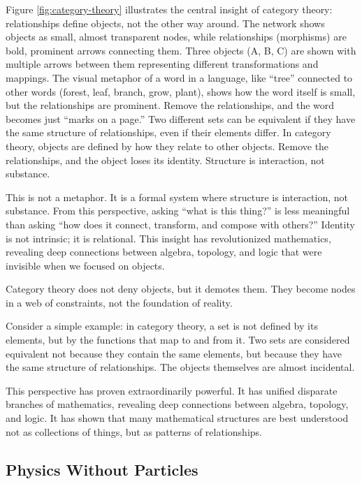 \documentclass[
  openright]{book}
\begin{document}
Figure \ref{fig:category-theory} illustrates the central insight of
category theory: relationships define objects, not the other way around.
The network shows objects as small, almost transparent nodes, while
relationships (morphisms) are bold, prominent arrows connecting them.
Three objects (A, B, C) are shown with multiple arrows between them
representing different transformations and mappings. The visual metaphor
of a word in a language, like ``tree'' connected to other words (forest,
leaf, branch, grow, plant), shows how the word itself is small, but the
relationships are prominent. Remove the relationships, and the word
becomes just ``marks on a page.'' Two different sets can be equivalent
if they have the same structure of relationships, even if their elements
differ. In category theory, objects are defined by how they relate to
other objects. Remove the relationships, and the object loses its
identity. Structure is interaction, not substance.

This is not a metaphor. It is a formal system where structure is
interaction, not substance. From this perspective, asking ``what is this
thing?'' is less meaningful than asking ``how does it connect,
transform, and compose with others?'' Identity is not intrinsic; it is
relational. This insight has revolutionized mathematics, revealing deep
connections between algebra, topology, and logic that were invisible
when we focused on objects.

Category theory does not deny objects, but it demotes them. They become
nodes in a web of constraints, not the foundation of reality.

Consider a simple example: in category theory, a set is not defined by
its elements, but by the functions that map to and from it. Two sets are
considered equivalent not because they contain the same elements, but
because they have the same structure of relationships. The objects
themselves are almost incidental.

This perspective has proven extraordinarily powerful. It has unified
disparate branches of mathematics, revealing deep connections between
algebra, topology, and logic. It has shown that many mathematical
structures are best understood not as collections of things, but as
patterns of relationships.

\subsection{Physics Without Particles}\label{physics-without-particles}
\end{document}
